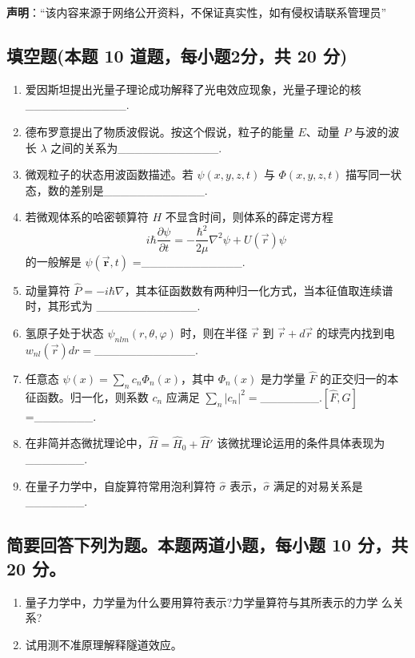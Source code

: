 
\textbf{声明}：“该内容来源于网络公开资料，不保证真实性，如有侵权请联系管理员”

\subsection{填空题(本题 10 道题，每小题2分，共 20 分)}
\begin{enumerate}
\item 爱因斯坦提出光量子理论成功解释了光电效应现象，光量子理论的核____________.
\item 德布罗意提出了物质波假说。按这个假说，粒子的能量 $E$、动量 $P$ 与波的波长 $\lambda$ 之间的关系为____________.
\item 微观粒子的状态用波函数描述。若 $\psi(x,y,z,t)$ 与 $\Phi(x,y,z,t)$ 描写同一状态，数的差别是____________.
\item 若微观体系的哈密顿算符 $H$ 不显含时间，则体系的薛定谔方程 
   $$i \hbar \frac{\partial \psi}{\partial t} = -\frac{\hbar^2}{2 \mu} \nabla^2 \psi + U(\vec r) \psi~$$
    的一般解是 $\psi(\mathbf{\vec r},t)$ =____________.
\item 动量算符 $\hat{P} = -i\hbar\nabla$，其本征函数数有两种归一化方式，当本征值取连续谱时，其形式为 ____________.
\item 氢原子处于状态 $\psi_{nlm}(r, \theta, \varphi)$ 时，则在半径 $\vec r$ 到 $\vec r + d\vec r$ 的球壳内找到电 $w_{nl}(\vec r) dr =$____________.
\item 任意态 $\psi(x) = \sum_n c_n \Phi_n(x)$，其中 $\Phi_n(x)$ 是力学量 $\hat{F}$ 的正交归一的本征函数。归一化，则系数 $c_n$ 应满足 $\sum_n |c_n|^2 =$_______.$[\hat{F}, \hat{G}] $=_______.
\item 在非简并态微扰理论中，$\hat{H} = \hat{H}_0 + \hat{H}'$ 该微扰理论运用的条件具体表现为_______.
\item 在量子力学中，自旋算符常用泡利算符 $\hat\sigma$ 表示，$\hat\sigma$ 满足的对易关系是_______.
\end{enumerate}
\subsection{简要回答下列为题。本题两道小题，每小题 10 分，共 20 分。}
\begin{enumerate}
\item 量子力学中，力学量为什么要用算符表示?力学量算符与其所表示的力学
么关系?
\item 试用测不准原理解释隧道效应。
\end{enumerate}
